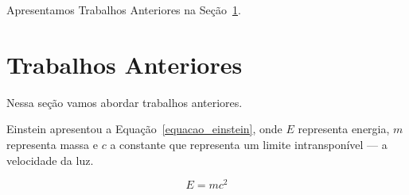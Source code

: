 \documentclass[12pt]{article}
\begin{document}
		Apresentamos Trabalhos Anteriores na Seção~\ref{trabalhos_anteriores}.


	\section{Trabalhos Anteriores}
		\label{trabalhos_anteriores}

		Nessa seção vamos abordar trabalhos anteriores.
		
		Einstein apresentou a Equação~\eqref{equacao_einstein}, onde $E$ representa energia, $m$ representa massa e $c$ a constante que representa um limite intransponível --- a velocidade da luz.
	
	\begin{equation}
		\label{equacao_einstein}
		E = mc^2		
	\end{equation}

	
\end{document}
